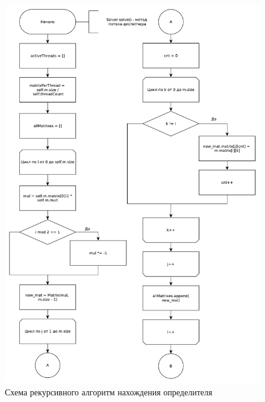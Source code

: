 \documentclass[12pt]{report}
\begin{document}
    \begin{figure}[H]
        \centering
        \includegraphics[width=0.85\linewidth]{img/solver_part_1}
        \caption{
            Схема рекурсивного алгоритм нахождения определителя
        }
        \label{img:solver_1}
    \end{figure}
\end{document}
